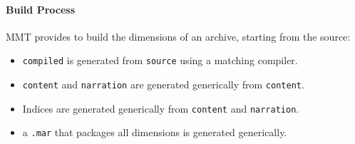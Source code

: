 \paragraph{Build Process}
MMT provides to build the dimensions of an archive, starting from the source:
\begin{itemize}
 \item \texttt{compiled} is generated from \texttt{source} using a matching compiler.
 \item \texttt{content} and \texttt{narration} are generated generically from \texttt{content}.
 \item Indices are generated generically from \texttt{content} and \texttt{narration}.
 \item a \texttt{.mar} that packages all dimensions is generated generically.
\end{itemize}

